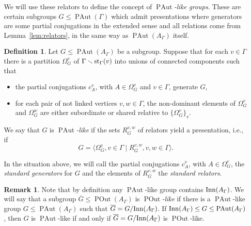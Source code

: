\documentclass[10pt]{amsart}
\theoremstyle{definition}
\newtheorem{definition}[theorem]{Definition}
\newtheorem{remark}[theorem]{Remark}
\newcommand{\Inn}{{\rm Inn}}
\newcommand{\st}{{\rm st}}
\newcommand{\PAut}{\operatorname{PAut}}
\newcommand{\POut}{\operatorname {POut}}
\theoremstyle{definition}
\numberwithin{equation}{section}
\begin{document}
%


We will use these relators to define the concept of {\sl $\PAut$-like groups}. These are certain subgroups $G \leq \PAut(\Gamma)$ which admit presentations where generators are some partial conjugations in the extended sense and all relations come from Lemma~\ref{lem:relators}, in the same way as $\PAut(A_\Gamma)$ itself.

 \begin{definition}\label{def:PAut}
Let $G\leq\PAut(A_\Gamma)$ be a subgroup. Suppose that for each $v\in\Gamma$ there is a partition
$\Omega_G^v$ of $\Gamma\smallsetminus\st_\Gamma(v)$ into unions of connected components such that
\begin{itemize}
\item[i)] the partial conjugations $c_A^v$, with $A\in\Omega_G^v$ and $v\in\Gamma$, generate $G$,

\item[ii)] for each pair of not linked vertices $v,w\in\Gamma$, the non-dominant elements of $\Omega_G^v$ and $\Omega_G^w$ are either subordinate or shared relative to $\{\Omega_G^v\}_v$.
\end{itemize}
We say that $G$ is \emph{$\PAut$-like} if the sets $R_G^{v,w}$ of relators yield a presentation, i.e., if
\[G=\langle \Omega^v_G,v\in\Gamma\mid R^{v,w}_G, v,w\in\Gamma\rangle.\]
\end{definition}


In the situation above, we will call the partial conjugations $c_A^v$, with $A \in \Omega_G^v$, the {\sl standard generators} for $G$ and the elements of $R_G^{v,w}$ the {\sl standard relators}.


\begin{remark} Note that by definition any $\PAut$-like group contains $\Inn(A_\Gamma)$.
We will say that a subgroup $\overline{G}\leq\POut(A_\Gamma)$ is {\sl $\POut$-like} if there is a $\PAut$-like group $G\leq\PAut(A_\Gamma)$ such that $\overline{G}=G/\Inn(A_\Gamma)$. If $\Inn(A_\Gamma)\leq G\leq\PAut(A_\Gamma)$, then $G$ is $\PAut$-like if and only if $\overline{G} = G/\Inn(A_\Gamma)$ is $\POut$-like.
\end{remark}
\end{document}
